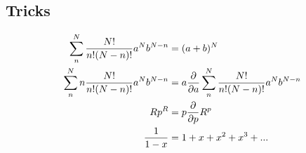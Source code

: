 \documentclass[a4paper, norsk, 8pt]{article}
\begin{document}
\begin{multicols*}{3}
\subsection*{\footnotesize  Tricks}
\begin{align*}
  \sum_{n}^{N} \frac{N!}{n!(N-n)!}a^Nb^{N-n} &= (a+b)^N \\
  \sum_{n}^{N} n\frac{N!}{n!(N-n)!}a^Nb^{N-n} &= a\pdv{}{a}\sum_{n}^{N} \frac{N!}{n!(N-n)!}a^Nb^{N-n} \\
  Rp^{R} &= p \pdv{}{p}R^{p} \\
  \frac{1}{1-x} &= 1 + x + x^2 + x^3 +...
\end{align*}

\end{multicols*}
\end{document}
